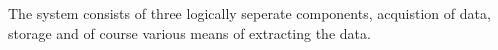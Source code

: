 The system consists of three logically seperate components, acquistion of data,
storage and of course various means of extracting the data.
